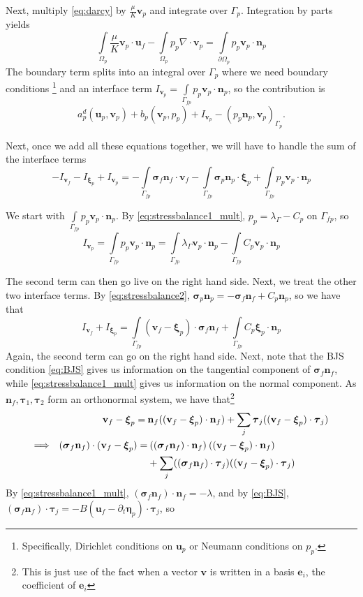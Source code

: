 \documentclass{article}
\newcommand{\mathspace}[1]{\ensuremath{#1}\xspace} %
\newcommand{\sigmabf}{\mathspace{\boldsymbol{\sigma}}}
\renewcommand{\div}{\mathspace{\nabla \cdot}}
\newcommand{\ddt}[1]{\mathspace{\partial_t #1}}
\newcommand{\taubf}{\mathspace{\boldsymbol{\tau}}}
\newcommand{\darcy}{\mathspace{\Omega_{p}}}
\newcommand{\darcybdy}{\mathspace{\Gamma_{p}}}
\newcommand{\interface}{\mathspace{\Gamma_{fp}}}
\newcommand{\nf}{\mathspace{\mathbf{n}_f}}
\newcommand{\np}{\mathspace{\mathbf{n}_p}}
\newcommand{\intD}{\mathspace{\int \limits_{\darcy}}}
\newcommand{\intDbdyI}{\mathspace{\int \limits_{\partial \darcy}}}
\newcommand{\intI}{\mathspace{\int \limits_{\interface}}}
\newcommand{\uf}{\mathspace{\mathbf{u}_f}}
\newcommand{\vf}{\mathspace{\mathbf{v}_f}}
\newcommand{\up}{\mathspace{\mathbf{u}_p}}
\newcommand{\vp}{\mathspace{\mathbf{v}_p}}
\newcommand{\pp}{\mathspace{p_p}}
\newcommand{\disp}{\mathspace{\boldsymbol{\eta}_p}}
\newcommand{\disptest}{\mathspace{\boldsymbol{\xi}_p}}
\newcommand{\mult}{\mathspace{\lambda_{\Gamma}}}
\begin{document}
Next, multiply \eqref{eq:darcy} by $\frac {\mu} {K} \vp$ and integrate over \darcybdy. Integration by parts yields
$$ \intD \frac {\mu} {K} \vp \cdot \uf -  \intD \pp \div \vp = \intDbdyI \pp \vp \cdot \np$$ 
The boundary term splits into an integral over \darcybdy where we need boundary conditions \footnote{Specifically, Dirichlet conditions on \up or Neumann conditions on \pp.} and an interface term $I_{\vp} = \intI \pp \vp \cdot \np$, so the contribution is
$$a_p^d(\up, \vp) + b_p(\vp, \pp) + I_{\vp} - (\pp \np, \vp)_{\darcybdy}.$$

Next, once we add all these equations together, we will have to handle the sum of the interface terms $$-I_{\vf} - I_{\disptest} + I_{\vp} = -\intI \sigmabf_f \nf \cdot \vf -\intI \sigmabf_p \np \cdot \disptest + \intI \pp \vp \cdot \np$$

We start with $\intI \pp \vp \cdot \np$. By \eqref{eq:stressbalance1_mult}, $\pp = \mult - C_p$ on \interface, so
$$I_{\vp} = \intI \pp \vp \cdot \np = \intI \mult \vp \cdot \np - \intI C_p \vp \cdot \np$$

The second term can then go live on the right hand side. Next, we treat the other two interface terms. By \eqref{eq:stressbalance2}, $\sigmabf_p \np = - \sigmabf_f \nf + C_p \np$, so we have that $$I_{\vf} + I_{\disptest} = \intI (\vf - \disptest) \cdot \sigmabf_f \nf + \intI C_p \disptest \cdot  \np$$
Again, the second term can go on the right hand side. Next, note that the BJS condition \eqref{eq:BJS} gives us information on the tangential component of $\sigmabf_f \nf$, while \eqref{eq:stressbalance1_mult} gives us information on the normal component. As $\nf, \taubf_1, \taubf_2$ form an orthonormal system, we have that\footnote{This is just use of the fact when a vector $\mathbf{v}$ is written in a basis $\mathbf{e}_i$, the coefficient of $\mathbf{e}_i$    }
\begin{align*}
  \vf - \disptest = \: &\nf ((\vf - \disptest) \cdot \nf) + \sum_j \taubf_j ((\vf - \disptest) \cdot \taubf_j) \\
  \Longrightarrow \hspace{0.02\textwidth}  (\sigmabf_f \nf) \cdot (\vf - \disptest) = & \: ((\sigmabf_f \nf) \cdot \nf) \: ((\vf - \disptest) \cdot \nf) \\
  & + \sum_j ((\sigmabf_f \nf) \cdot \taubf_j) ((\vf - \disptest) \cdot \taubf_j)
\end{align*}
By \eqref{eq:stressbalance1_mult}, $(\sigmabf_f \nf) \cdot \nf = -\lambda$, and by \eqref{eq:BJS}, $(\sigmabf_f \nf) \cdot \taubf_j = -B \left ( \uf - \ddt{\disp} \right ) \cdot \taubf_j$, so
\end{document}
